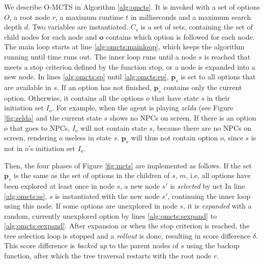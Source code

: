 We describe O-MCTS in Algorithm \ref{alg:omcts}. It is invoked with a set of
options $O$, a root node $r$, a maximum runtime $t$ in milliseconds and a
maximum search depth $d$. Two variables are instantiated. $C_s$ is a set of
sets, containing the set of child nodes for each node and $\mathbf{o}$ contains
which option is followed for each node. The main loop starts at line
\ref{alg:omcts:mainloop}, which keeps the algorithm running until time runs out.
The inner loop runs until a node $s$ is reached that meets a stop criterion
defined by the function \textsf{stop}, or a node is expanded into a new node.
In lines \ref{alg:omcts:sp} until \ref{alg:omcts:ep}, $\mathbf{p}_s$ is set to
all options that are available in $s$. If an option has not finished,
$\mathbf{p}_s$ contains only the current option. Otherwise, it contains all the
options $o$ that have state $s$ in their initiation set $I_o$. For example, when
the agent is playing \textit{zelda} (see Figure \ref{fig:zelda} and the current state $s$
shows no NPCs on screen. If there is an option $o$ that goes to NPCs, $I_o$ will
not contain state $s$, because there are no NPCs on screen, rendering $o$
useless in state $s$. $\mathbf{p}_s$ will thus not contain option $o$, since $s$
is not in $o$'s initiation set $I_o$.

Then, the four phases of Figure \ref{fig:mcts} are implemented as follows.  If
the set $\mathbf{p}_s$ is the same as the set of options in the children of $s$,
$m$, i.e. all options have been explored at least once in node $s$, a new node
$s'$ is \emph{selected} by \textsf{uct} In line \ref{alg:omcts:ss}, $s$ is
instantiated with the new node $s'$, continuing the inner loop using this node.
If some options are unexplored in node $s$, it is \emph{expanded} with a random,
currently unexplored option by lines \ref{alg:omcts:sexpand} to
\ref{alg:omcts:eexpand}. After expansion or when the stop criterion is reached,
the tree selection loop is stopped and a \emph{rollout} is done, resulting in
score difference $\delta$. This score difference is \emph{backed up} to the
parent nodes of $s$ using the backup function, after which the tree traversal
restarts with the root node $r$.

